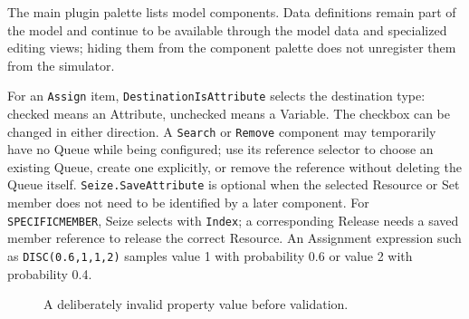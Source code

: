 The main plugin palette lists model components. Data definitions remain part of the model and continue to
be available through the model data and specialized editing views; hiding them from the component palette
does not unregister them from the simulator.

For an \texttt{Assign} item, \texttt{DestinationIsAttribute} selects the destination type:
checked means an Attribute, unchecked means a Variable. The checkbox can be changed in either
direction. A \texttt{Search} or \texttt{Remove} component may temporarily have no Queue while being
configured; use its reference selector to choose an existing Queue, create one explicitly, or remove
the reference without deleting the Queue itself. \texttt{Seize.SaveAttribute} is optional when the
selected Resource or Set member does not need to be identified by a later component. For
\texttt{SPECIFICMEMBER}, Seize selects with \texttt{Index}; a corresponding Release needs a saved
member reference to release the correct Resource. An Assignment expression such as
\texttt{DISC(0.6,1,1,2)} samples value 1 with probability 0.6 or value 2 with probability 0.4.

\begin{figure}[htbp]
\centering
\caption{A deliberately invalid property value before validation.}
\label{fig:model-editing-invalid-property}
\end{figure}

